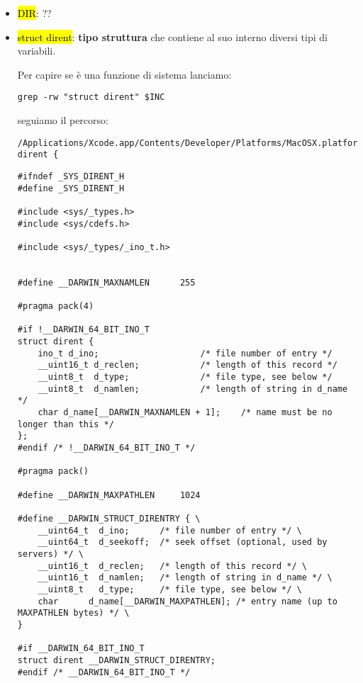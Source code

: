 \begin{itemize}
	\item \hl{DIR}: ??
	\item \hl{struct dirent}: \textbf{tipo struttura} che contiene al suo interno diversi tipi di variabili. 
	
		Per capire se è una funzione di sistema lanciamo:
		
\begin{lstlisting}
grep -rw "struct dirent" $INC
\end{lstlisting}
		
		seguiamo il percorso:
		
\begin{lstlisting}
/Applications/Xcode.app/Contents/Developer/Platforms/MacOSX.platform/Developer/SDKs/MacOSX.sdk/usr/include//sys/dirent.h:struct dirent {
\end{lstlisting}
		
\begin{lstlisting}
#ifndef _SYS_DIRENT_H
#define _SYS_DIRENT_H

#include <sys/_types.h>
#include <sys/cdefs.h>

#include <sys/_types/_ino_t.h>


#define __DARWIN_MAXNAMLEN      255

#pragma pack(4)

#if !__DARWIN_64_BIT_INO_T
struct dirent {
	ino_t d_ino;                    /* file number of entry */
	__uint16_t d_reclen;            /* length of this record */
	__uint8_t  d_type;              /* file type, see below */
	__uint8_t  d_namlen;            /* length of string in d_name */
	char d_name[__DARWIN_MAXNAMLEN + 1];    /* name must be no longer than this */
};
#endif /* !__DARWIN_64_BIT_INO_T */

#pragma pack()

#define __DARWIN_MAXPATHLEN     1024

#define __DARWIN_STRUCT_DIRENTRY { \
	__uint64_t  d_ino;      /* file number of entry */ \
	__uint64_t  d_seekoff;  /* seek offset (optional, used by servers) */ \
	__uint16_t  d_reclen;   /* length of this record */ \
	__uint16_t  d_namlen;   /* length of string in d_name */ \
	__uint8_t   d_type;     /* file type, see below */ \
	char      d_name[__DARWIN_MAXPATHLEN]; /* entry name (up to MAXPATHLEN bytes) */ \
}

#if __DARWIN_64_BIT_INO_T
struct dirent __DARWIN_STRUCT_DIRENTRY;
#endif /* __DARWIN_64_BIT_INO_T */




\end{lstlisting}
\end{itemize}
